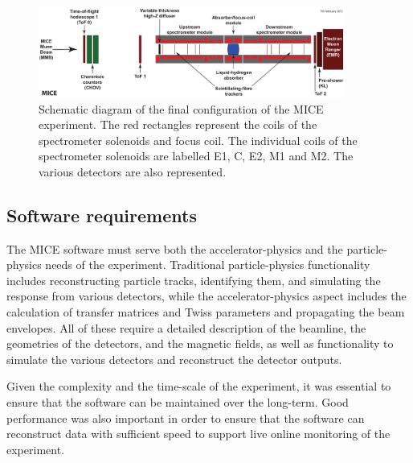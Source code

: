 \documentclass{JINST}
\begin{document}

\begin{figure}[!htb]
\centering
\includegraphics[width=0.9\textwidth]{figs/step4-layout.pdf}
\caption{ Schematic diagram of the final configuration of the MICE experiment. The red rectangles represent the coils of the spectrometer solenoids and focus coil. The individual coils of the spectrometer solenoids are labelled E1, C, E2, M1 and M2. The various detectors are also represented.}
\label{fig:step4}
\end{figure}


\subsection{Software requirements} \label{sec:requirements}

The MICE software must serve both the accelerator-physics and the particle-physics needs of the experiment. Traditional particle-physics functionality includes reconstructing particle tracks, identifying them, and simulating the response from various detectors, while the accelerator-physics aspect includes the calculation of transfer matrices and Twiss parameters and propagating the beam envelopes. All of these require a detailed description of the beamline, the geometries of the detectors, and the magnetic fields, as well as functionality to simulate the various detectors and reconstruct the detector outputs. 

Given the complexity and the time-scale of the experiment, it was essential to ensure that the software can be maintained over the long-term. Good performance was also important in order to ensure that the software can reconstruct data with sufficient speed to support live online monitoring of the experiment.

\end{document}
